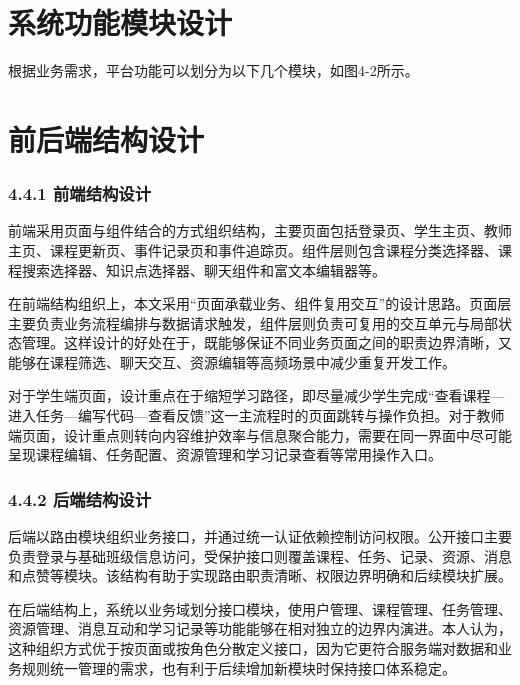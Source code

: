 \section{系统功能模块设计}\label{ux7cfbux7edfux529fux80fdux6a21ux5757ux8bbeux8ba1}

根据业务需求，平台功能可以划分为以下几个模块，如图4-2所示。

\tikzFunctionModulesFigure

\section{前后端结构设计}\label{ux524dux540eux7aefux7ed3ux6784ux8bbeux8ba1}

\subsubsection{4.4.1 前端结构设计}\label{ux524dux7aefux7ed3ux6784ux8bbeux8ba1}

前端采用页面与组件结合的方式组织结构，主要页面包括登录页、学生主页、教师主页、课程更新页、事件记录页和事件追踪页。组件层则包含课程分类选择器、课程搜索选择器、知识点选择器、聊天组件和富文本编辑器等。

在前端结构组织上，本文采用``页面承载业务、组件复用交互''的设计思路。页面层主要负责业务流程编排与数据请求触发，组件层则负责可复用的交互单元与局部状态管理。这样设计的好处在于，既能够保证不同业务页面之间的职责边界清晰，又能够在课程筛选、聊天交互、资源编辑等高频场景中减少重复开发工作。

对于学生端页面，设计重点在于缩短学习路径，即尽量减少学生完成``查看课程---进入任务---编写代码---查看反馈''这一主流程时的页面跳转与操作负担。对于教师端页面，设计重点则转向内容维护效率与信息聚合能力，需要在同一界面中尽可能呈现课程编辑、任务配置、资源管理和学习记录查看等常用操作入口。

\subsubsection{4.4.2 后端结构设计}\label{ux540eux7aefux7ed3ux6784ux8bbeux8ba1}

后端以路由模块组织业务接口，并通过统一认证依赖控制访问权限。公开接口主要负责登录与基础班级信息访问，受保护接口则覆盖课程、任务、记录、资源、消息和点赞等模块。该结构有助于实现路由职责清晰、权限边界明确和后续模块扩展。

在后端结构上，系统以业务域划分接口模块，使用户管理、课程管理、任务管理、资源管理、消息互动和学习记录等功能能够在相对独立的边界内演进。本人认为，这种组织方式优于按页面或按角色分散定义接口，因为它更符合服务端对数据和业务规则统一管理的需求，也有利于后续增加新模块时保持接口体系稳定。

